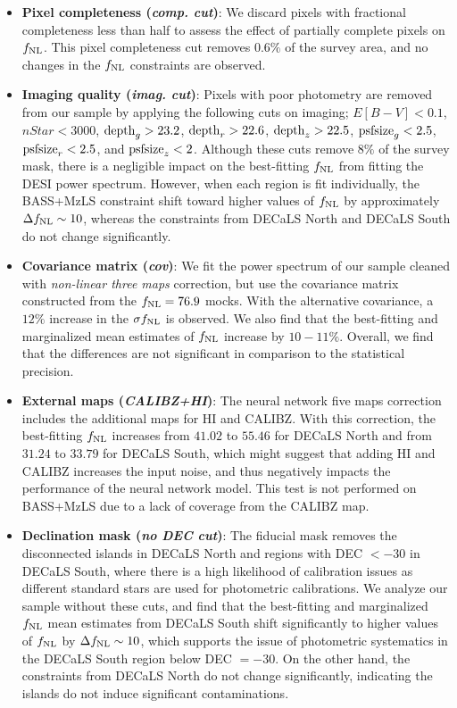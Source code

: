 \begin{itemize}[itemindent=*]
\item \textbf{Pixel completeness (\textit{comp. cut})}: We discard pixels with fractional completeness less than half to assess the effect of partially complete pixels on $f_{\rm NL}$. This pixel completeness cut removes $0.6\%$ of the survey area, and no changes in the $f_{\rm NL}$ constraints are observed.

\item \textbf{Imaging quality (\textit{imag. cut})}: Pixels with poor photometry are removed from our sample by applying the following cuts on imaging; $E[B-V]<0.1$, $nStar < 3000$, ${\rm depth}_{g} > 23.2$, ${\rm depth}_{r} > 22.6$, ${\rm depth}_{z} > 22.5$, ${\rm psfsize}_{g}<2.5$, ${\rm psfsize}_{r}<2.5$, and ${\rm psfsize}_{z}<2$. Although these cuts remove $8\%$ of the survey mask, there is a negligible impact on the best-fitting $f_{\rm NL}$ from fitting the DESI power spectrum. However, when each region is fit individually, the BASS+MzLS constraint shift toward higher values of $f_{\rm NL}$ by approximately $\Delta f_{\rm NL} \sim 10$, whereas the constraints from DECaLS North and DECaLS South do not change significantly. 

\item \textbf{Covariance matrix (\textit{cov})}: We fit the power spectrum of our sample cleaned with \textit{non-linear three maps} correction, but use the covariance matrix constructed from the $f_{\rm NL}=76.9$ mocks. With the alternative covariance, a $12\%$ increase in the $\sigma f_{\rm NL}$ is observed. We also find that the best-fitting and marginalized mean estimates of $f_{\rm NL}$ increase by $10-11\%$. Overall, we find that the differences are not significant in comparison to the statistical precision.

\item \textbf{External maps (\textit{CALIBZ+HI})}: The neural network five maps correction includes the additional maps for HI and CALIBZ. With this correction, the best-fitting $f_{\rm NL}$ increases from $41.02$ to $55.46$ for DECaLS North and from $31.24$ to $33.79$ for DECaLS South, which might suggest that adding HI and CALIBZ increases the input noise, and thus negatively impacts the performance of the neural network model. This test is not performed on BASS+MzLS due to a lack of coverage from the CALIBZ map. 

\item \textbf{Declination mask (\textit{no DEC cut})}: The fiducial mask removes the disconnected islands in DECaLS North and regions with DEC $<-30$ in DECaLS South, where there is a high likelihood of calibration issues as different standard stars are used for photometric calibrations. We analyze our sample without these cuts, and find that the best-fitting and marginalized $f_{\rm NL}$ mean estimates from DECaLS South shift significantly to higher values of $f_{\rm NL}$ by $\Delta f_{\rm NL} \sim 10$, which supports the issue of photometric systematics in the DECaLS South region below DEC $=-30$. On the other hand, the constraints from DECaLS North do not change significantly, indicating the islands do not induce significant contaminations.


\end{itemize}
